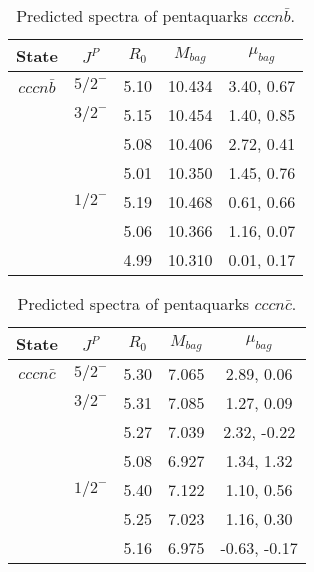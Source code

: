 \documentclass[prd,twocolumn,floatfix,nofootinbib]{revtex4}
\begin{document}
\renewcommand{\tabcolsep}{0.5cm}
\renewcommand{\arraystretch}{1.2}
\begin{table*}[!htbp]
    \caption{Predicted spectra of pentaquarks $cccn\bar{b}$.}
    \begin{tabular}{ccccc}
        \hline\hline
        {\rm State} &$J^{P}$ &$R_{0}$ &$M_{bag}$ &$\mu_{bag}$ \\ \hline
        ${cccn\bar{b}}$
            &${5/2}^{-}$    &5.10   &10.434 &3.40, 0.67 \\
            &${3/2}^{-}$    &5.15   &10.454 &1.40, 0.85 \\
            &               &5.08   &10.406 &2.72, 0.41 \\
            &               &5.01   &10.350 &1.45, 0.76 \\
            &${1/2}^{-}$    &5.19   &10.468 &0.61, 0.66 \\
            &               &5.06   &10.366 &1.16, 0.07 \\
            &               &4.99   &10.310 &0.01, 0.17 \\
        \hline\hline 
    \end{tabular}
\end{table*}

\renewcommand{\tabcolsep}{0.5cm}
\renewcommand{\arraystretch}{1.2}
\begin{table*}[!htbp]
    \caption{Predicted spectra of pentaquarks $cccn\bar{c}$.}
    \begin{tabular}{ccccc}
        \hline\hline
        {\rm State} &$J^{P}$ &$R_{0}$ &$M_{bag}$ &$\mu_{bag}$ \\ \hline
        ${cccn\bar{c}}$
            &${5/2}^{-}$    &5.30   &7.065  &2.89, 0.06 \\
            &${3/2}^{-}$    &5.31   &7.085  &1.27, 0.09 \\
            &               &5.27   &7.039  &2.32, -0.22 \\
            &               &5.08   &6.927  &1.34, 1.32 \\
            &${1/2}^{-}$    &5.40   &7.122  &1.10, 0.56 \\
            &               &5.25   &7.023  &1.16, 0.30 \\
            &               &5.16   &6.975  &-0.63, -0.17 \\
        \hline\hline 
    \end{tabular}
\end{table*}
\end{document}
